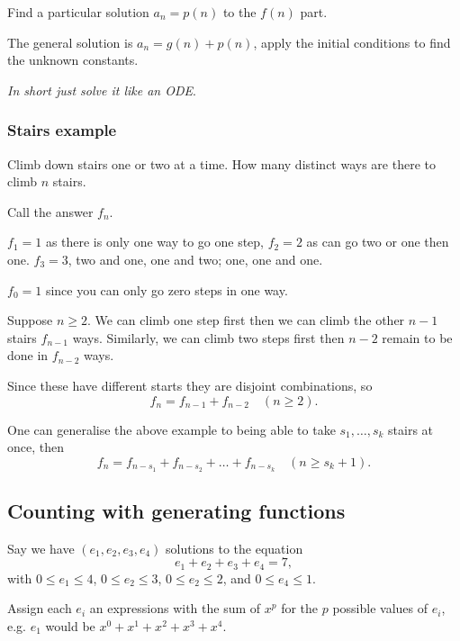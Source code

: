 \documentclass[10pt, a4paper]{article}
\begin{document}
Find a particular solution $a_n = p(n)$ to the $f(n)$ part.

The general solution is $a_n = g(n) + p(n)$,
apply the initial conditions to find the unknown constants.

\textit{In short just solve it like an ODE}.

\subsubsection{Stairs example}
\begin{example}
    Climb down stairs
    one or two at a time.
    How many distinct ways are there to climb $n$ stairs.

    \begin{solution}
        Call the answer $f_n$.

        $f_1 = 1$ as there is only one way to go one step,
        $f_2 = 2$ as can go two or one then one.
        $f_3 = 3$,
        two and one,
        one and two;
        one,
        one and one.

        $f_0 = 1$ since you can only go zero steps in one way.

        Suppose $n \geq 2$.
        We can climb one step first then we can climb the other $n - 1$ stairs $f_{n - 1}$ ways.
        Similarly,
        we can climb two steps first then $n - 2$ remain to be done in $f_{n - 2}$ ways.

        Since these have different starts they are disjoint combinations,
        so
        \[
        f_n = f_{n - 1} + f_{n - 2}\quad(n \geq 2).
        \]        
    \end{solution}
\end{example}

One can generalise the above example to being able to take $s_1, \dotsc, s_k$ stairs at once,
then
\[
f_n = f_{n - s_1} + f_{n - s_2} + \dotsc + f_{n - s_k}\quad(n \geq s_k + 1).
\]

\subsection{Counting with generating functions}
Say we have $(e_1, e_2, e_3, e_4)$ solutions to the equation
\[
e_1 + e_2 + e_3 + e_4 = 7,
\]
with $0 \leq e_1 \leq 4$,
$0 \leq e_2 \leq 3$,
$0 \leq e_2 \leq 2$,
and $0 \leq e_4 \leq 1$.

Assign each $e_i$ an expressions with the sum of $x ^ p$ for the $p$ possible values of $e_i$,
e.g.
$e_1$ would be $x ^ 0 + x ^ 1 + x ^ 2 + x ^ 3 + x ^ 4$.
\end{document}
